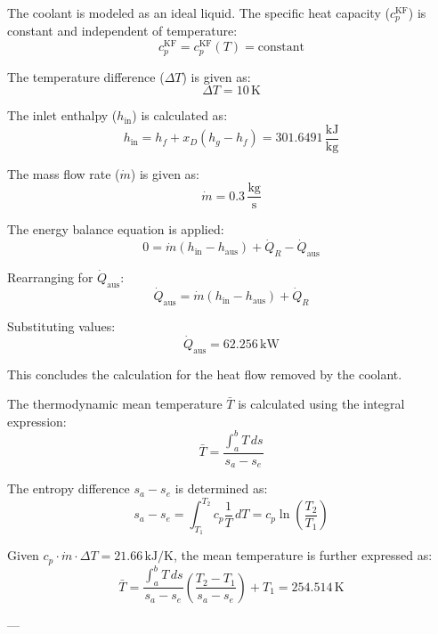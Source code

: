 The coolant is modeled as an ideal liquid. The specific heat capacity (\( c_p^{\text{KF}} \)) is constant and independent of temperature:  
\[
c_p^{\text{KF}} = c_p^{\text{KF}}(T) = \text{constant}
\]  

The temperature difference (\( \Delta T \)) is given as:  
\[
\Delta T = 10 \, \text{K}
\]  

The inlet enthalpy (\( h_{\text{in}} \)) is calculated as:  
\[
h_{\text{in}} = h_f + x_D \left( h_g - h_f \right) = 301.6491 \, \frac{\text{kJ}}{\text{kg}}
\]  

The mass flow rate (\( \dot{m} \)) is given as:  
\[
\dot{m} = 0.3 \, \frac{\text{kg}}{\text{s}}
\]  

The energy balance equation is applied:  
\[
0 = \dot{m} \left( h_{\text{in}} - h_{\text{aus}} \right) + \dot{Q}_R - \dot{Q}_{\text{aus}}
\]  

Rearranging for \( \dot{Q}_{\text{aus}} \):  
\[
\dot{Q}_{\text{aus}} = \dot{m} \left( h_{\text{in}} - h_{\text{aus}} \right) + \dot{Q}_R
\]  

Substituting values:  
\[
\dot{Q}_{\text{aus}} = 62.256 \, \text{kW}
\]  

This concludes the calculation for the heat flow removed by the coolant.

The thermodynamic mean temperature \( \bar{T} \) is calculated using the integral expression:  
\[
\bar{T} = \frac{\int_a^b T \, ds}{s_a - s_e}
\]  

The entropy difference \( s_a - s_e \) is determined as:  
\[
s_a - s_e = \int_{T_1}^{T_2} c_{p} \frac{1}{T} \, dT = c_{p} \ln \left( \frac{T_2}{T_1} \right)
\]  

Given \( c_{p} \cdot \dot{m} \cdot \Delta T = 21.66 \, \text{kJ/K} \), the mean temperature is further expressed as:  
\[
\bar{T} = \frac{\int_a^b T \, ds}{s_a - s_e} \left( \frac{T_2 - T_1}{s_a - s_e} \right) + T_1 = 254.514 \, \text{K}
\]  

---